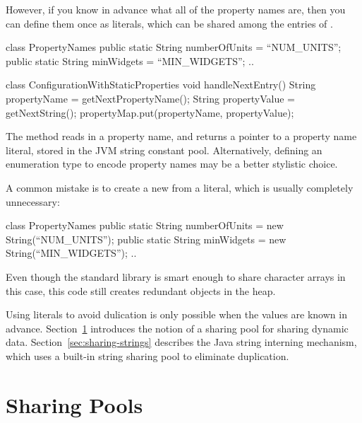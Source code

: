However, if you know in advance what all of the property names are, then you can
define them once as  literals, which can be shared among the
entries of .
\begin{shortlisting}
class PropertyNames {
	public static String numberOfUnits = ``NUM_UNITS'';
	public static String minWidgets = ``MIN_WIDGETS'';
	..
}

class ConfigurationWithStaticProperties {
    void handleNextEntry() {
       String propertyName = getNextPropertyName(); 
       String propertyValue = getNextString();
       propertyMap.put(propertyName, propertyValue);
    }
}
\end{shortlisting}
The  method reads in a property name, and returns
a pointer to a property name literal, stored in the JVM string
constant pool. Alternatively, defining an enumeration
type to encode property names may be a better stylistic choice.

A common
 mistake is to create a new   from a  literal,
 which is usually completely unnecessary:
\begin{shortlisting}
class PropertyNames {
	public static String numberOfUnits = 
	                           new String(``NUM_UNITS'');
	public static String minWidgets = 
	                           new String(``MIN_WIDGETS'');
	..
}
\end{shortlisting}
Even though the standard library is smart enough to share
character arrays in this case, this code still creates redundant 
objects in the heap.

Using  literals to avoid dulication is only possible when the
 values are known in advance. 
Section~\ref{sec:sharing-pools} introduces the notion of a sharing pool for
sharing dynamic data. Section~\ref{sec:sharing-strings} describes the Java
string interning mechanism, which uses a built-in string sharing pool to
eliminate duplication.

\section{Sharing Pools}
\label{sec:sharing-pools}

